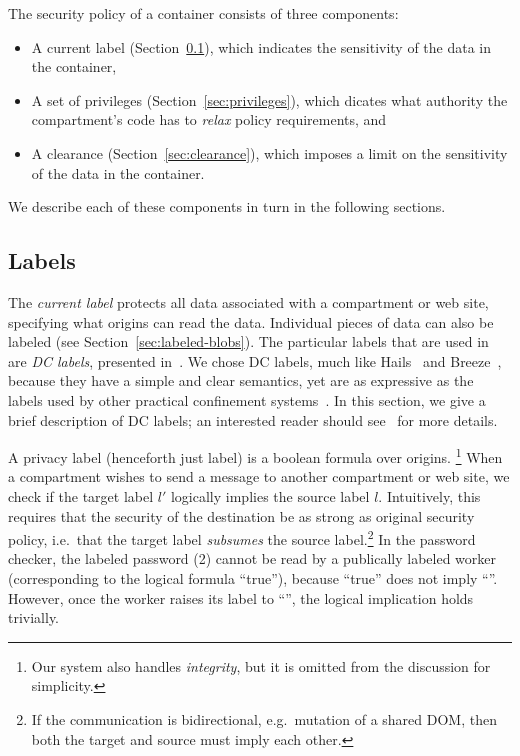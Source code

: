 The security policy of a container consists of three components:

\begin{itemize}
    \item A current label (Section~\ref{sec:labels}), which indicates the
        sensitivity of the data in the container,
    \item A set of privileges (Section~\ref{sec:privileges}), which
        dicates what authority the compartment's code has to
        \emph{relax} policy requirements, and
    \item A clearance (Section~\ref{sec:clearance}), which imposes a
        limit on the sensitivity of the data in the container.
\end{itemize}

We describe each of these components in turn in the following sections.

\subsection{Labels}
\label{sec:labels}

The \emph{current label} protects all data associated with a compartment or
web site, specifying what origins can read the data.
%
Individual pieces of data can also be labeled (see Section~\ref{sec:labeled-blobs}).
%
The particular labels that are used in \sys{} are \emph{DC labels},
presented in~\cite{stefan:2011:dclabels}.
%
We chose DC labels, much like Hails~\cite{giffin:2012:hails} and
Breeze~\cite{Breeze13}, because they have a simple and clear
semantics, yet are as expressive as the labels used by other practical
confinement systems~\cite{GenLabels}.
%
In this section, we give a brief description of DC labels; an interested
reader should see~\cite{stefan:2011:dclabels} for more details.

A privacy label (henceforth just label) is a boolean formula over
origins.%
%
\footnote{
  Our system also handles \emph{integrity}, but it is omitted from
  the discussion for simplicity.
}
%
When a compartment wishes to send a message to another compartment or
web site, we check if the target label $l'$ logically implies the source
label $l$.
%
Intuitively, this requires that the security of the destination be as strong as original security policy, i.e.\ that the target label \emph{subsumes} the source label.\footnote{If the communication is bidirectional, e.g.\ mutation of a shared DOM, then both the target and source must imply each other.}
%
In the password checker, the labeled password (2) cannot be read by a
publically labeled worker (corresponding to the logical formula
``true''), because ``true'' does not imply ``''.
%
However, once the worker raises its label to ``'', the
logical implication holds trivially.

